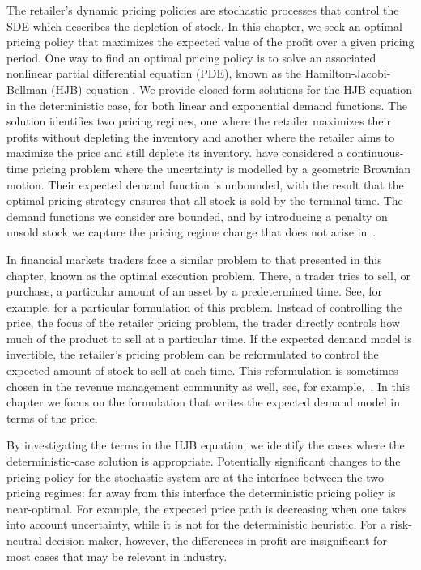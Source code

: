 \documentclass[main.tex]{subfiles}
\begin{document}
The retailer's dynamic pricing policies are stochastic processes that
control the SDE which describes the depletion of stock. In this
chapter, we seek an optimal pricing policy that maximizes the expected value of
the profit over a given pricing period.
One way to find an optimal pricing policy is to solve an associated nonlinear partial
differential equation (PDE), known as the Hamilton-Jacobi-Bellman (HJB) equation
\citep{pham2009continuous}.
We provide closed-form solutions for the HJB equation in the
deterministic case, for both linear
and exponential demand functions. The solution identifies two pricing
regimes, one where the retailer maximizes their profits without
depleting the inventory and another
where the retailer aims to maximize the price and still deplete
its inventory.
\citet{xu2006monopolistic} have considered a continuous-time pricing
problem where the uncertainty is modelled by a geometric Brownian
motion. Their expected demand function is unbounded, with the result that the
optimal pricing strategy ensures that all stock is sold by the
terminal time. The demand functions we consider are bounded, and by
introducing a penalty on unsold stock we capture the pricing regime
change that does not arise in~\cite{xu2006monopolistic}.

In financial markets traders face a similar problem to
that presented in this chapter, known as the optimal execution
problem. There, a trader tries to sell, or purchase,
a particular amount of an asset by a predetermined time. See, for example,
\cite{predoiu2011optimal} for a particular formulation of this problem.
Instead of controlling the price, the focus of the retailer pricing
problem, the trader directly controls how much
of the product to sell at a particular time. If the expected demand
model is invertible, the retailer's pricing problem can be
reformulated to control the expected amount of stock to sell at each
time. This reformulation is sometimes chosen in the revenue management
community as well, see, for example,~\cite{bitran2003overview}.
In this chapter we focus on the formulation that writes the expected
demand model in terms of the price.

By investigating the terms in the HJB equation,
we identify the cases where the deterministic-case solution is appropriate.
Potentially significant changes to the
pricing policy for the stochastic system are at the interface between
the two pricing regimes: far away from this interface the
deterministic pricing policy is near-optimal. For example, the
expected price path is decreasing when one takes into account
uncertainty, while it is not for the deterministic heuristic.
For a risk-neutral decision maker, however, the differences in profit
are insignificant for most cases that may be relevant in industry.
\end{document}
